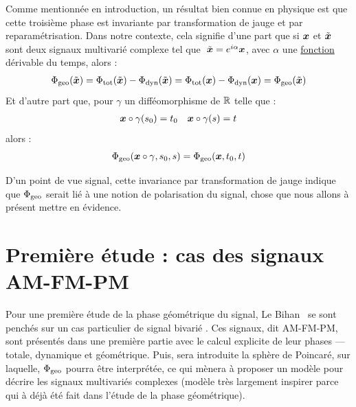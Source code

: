 Comme mentionnée en introduction, un résultat bien connue en physique \cite{bohm_geometric_2003,mukunda_quantum_1993,chruscinski_geometric_2004} est que cette troisième phase est invariante par transformation de jauge et par reparamétrisation. Dans notre contexte, cela signifie d'une part que si $\boldsymbol{x}$ et $\Tilde{\boldsymbol{x}}$ sont deux signaux multivarié complexe tel que $\ \Tilde{\boldsymbol{x}} = e^{i\alpha}\boldsymbol{x}$, avec $\alpha$ une \underline{fonction} dérivable du temps, alors :
\begin{align*}
	\Phi_{\text{\normalfont geo}}(\Tilde{\boldsymbol{x}}) &= \Phi_{\text{\normalfont tot}}(\Tilde{\boldsymbol{x}}) - \Phi_{\text{\normalfont dyn}}(\Tilde{\boldsymbol{x}})  = \Phi_{\text{\normalfont tot}}(\boldsymbol{x}) - \Phi_{\text{\normalfont dyn}}(\boldsymbol{x}) = \Phi_{\text{\normalfont geo}}(\Tilde{\boldsymbol{x}})\\
\end{align*}
Et d'autre part que, pour $\gamma$ un difféomorphisme de $\mathbb{R}$ telle que :
\begin{align*}
	\boldsymbol{x}\circ\gamma(s_0)&=t_0  &  \boldsymbol{x} \circ\gamma(s) = t
\end{align*}
alors :
\[\Phi_{\text{\normalfont geo}}(\boldsymbol{x} \circ \gamma, s_0, s) = \Phi_{\text{\normalfont geo}}(\boldsymbol{x}, t_0, t)\]
\skipl


D'un point de vue signal, cette invariance par transformation de jauge indique que $\Phi_{\text{\normalfont geo}}$ serait lié à une notion de polarisation du signal, chose que nous allons à présent mettre en évidence.
\\



\section{Première étude : cas des signaux AM-FM-PM} \label{sec:AM-FM-PM}

Pour une première étude de la phase géométrique du signal, Le Bihan \etal~se sont penchés sur un cas particulier de signal bivarié \cite{flamant_timefrequency_2019,le_bihan_modephysiques_2023, le_bihan_geometric_2024}. Ces signaux, dit AM-FM-PM, sont présentés dans une première partie avec le calcul explicite de leur phases --- totale, dynamique et géométrique. Puis, sera introduite la sphère de Poincaré, sur laquelle, $\Phi_{\text{\normalfont geo}}$ pourra être interprétée, ce qui mènera à proposer un modèle pour décrire les signaux multivariés complexes (modèle très largement inspirer parce qui à déjà été fait dans l'étude de la phase géométrique).
\\



